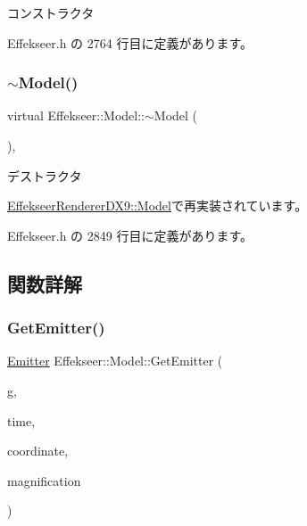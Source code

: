 コンストラクタ 



 Effekseer.\+h の 2764 行目に定義があります。

\mbox{\label{class_effekseer_1_1_model_a02266837426d39149d3eb56da7051c98}} 
\subsubsection{\texorpdfstring{$\sim$\+Model()}{~Model()}}
{\footnotesize\ttfamily virtual Effekseer\+::\+Model\+::$\sim$\+Model (\begin{DoxyParamCaption}{ }\end{DoxyParamCaption})\hspace{0.3cm}{\ttfamily [inline]}, {\ttfamily [virtual]}}



デストラクタ 



\mbox{\hyperlink{class_effekseer_renderer_d_x9_1_1_model_a5878dbe0a5971ffb28d6c1af347c6e87}{Effekseer\+Renderer\+D\+X9\+::\+Model}}で再実装されています。



 Effekseer.\+h の 2849 行目に定義があります。



\subsection{関数詳解}
\mbox{\label{class_effekseer_1_1_model_a42ec48630c9d7f8d0232777102bffe9a}} 
\subsubsection{\texorpdfstring{Get\+Emitter()}{GetEmitter()}}
{\footnotesize\ttfamily \mbox{\hyperlink{struct_effekseer_1_1_model_1_1_emitter}{Emitter}} Effekseer\+::\+Model\+::\+Get\+Emitter (\begin{DoxyParamCaption}\item[{\mbox{\hyperlink{class_effekseer_1_1_i_rand_object}{I\+Rand\+Object}} $\ast$}]{g,  }\item[{int32\+\_\+t}]{time,  }\item[{\mbox{\hyperlink{namespace_effekseer_ac8508f8823c5fcf36aac5d2ddee23765}{Coordinate\+System}}}]{coordinate,  }\item[{float}]{magnification }\end{DoxyParamCaption})\hspace{0.3cm}{\ttfamily [inline]}}



